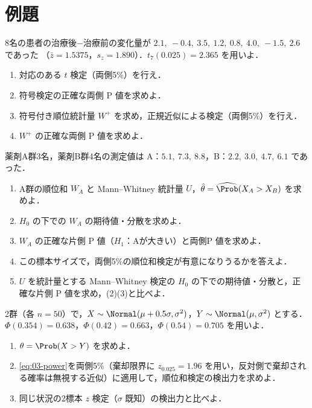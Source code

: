 \section{例題}\label{sec:03-ex}
\begin{reidai}\label{reidai:03-1}
8名の患者の治療後$-$治療前の変化量が
$2.1,\ -0.4,\ 3.5,\ 1.2,\ 0.8,\ 4.0,\ -1.5,\ 2.6$ であった
（$\bar z=1.5375$，$s_z=1.890$）．$t_7(0.025)=2.365$ を用いよ．
\begin{enumerate}[label=(\arabic*)]
\item 対応のある $t$ 検定（両側5\%）を行え．
\item 符号検定の正確な両側 P 値を求めよ．
\item 符号付き順位統計量 $W^+$ を求め，正規近似による検定（両側5\%）を行え．
\item $W^+$ の正確な両側 P 値を求めよ．
\end{enumerate}
\end{reidai}

\begin{reidai}[順位和検定の正確な分布]\label{reidai:03-2}
薬剤A群3名，薬剤B群4名の測定値は A：$5.1,\ 7.3,\ 8.8$，B：$2.2,\ 3.0,\ 4.7,\ 6.1$ であった．
\begin{enumerate}[label=(\arabic*)]
\item A群の順位和 $W_A$ と Mann--Whitney 統計量 $U$，$\hat\theta=\widehat{\Prob}(X_A>X_B)$ を求めよ．
\item $H_0$ の下での $W_A$ の期待値・分散を求めよ．
\item $W_A$ の正確な片側 P 値（$H_1$：Aが大きい）と両側P 値を求めよ．
\item この標本サイズで，両側5\%の順位和検定が有意になりうるかを答えよ．
\item $U$ を統計量とする Mann--Whitney 検定の $H_0$ の下での期待値・分散と，正確な片側 P 値を求め，(2)(3)と比べよ．
\end{enumerate}
\end{reidai}

\begin{reidai}\label{reidai:03-3}
2群（各 $n=50$）で，$X\sim\Normal(\mu+0.5\sigma,\sigma^2)$，$Y\sim\Normal(\mu,\sigma^2)$ とする．
$\Phi(0.354)=0.638$，$\Phi(0.42)=0.663$，$\Phi(0.54)=0.705$ を用いよ．
\begin{enumerate}[label=(\arabic*)]
\item $\theta=\Prob(X>Y)$ を求めよ．
\item \cref{eq:03-power}を両側5\%（棄却限界に $z_{0.025}=1.96$ を用い，反対側で棄却される確率は無視する近似）に適用して，順位和検定の検出力を求めよ．
\item 同じ状況の2標本 $z$ 検定（$\sigma$ 既知）の検出力と比べよ．
\end{enumerate}
\end{reidai}

